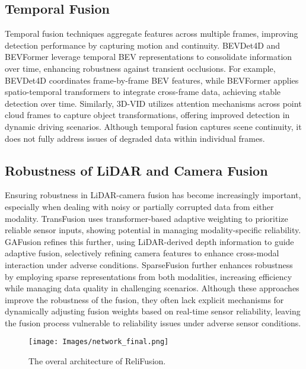 \subsection{Temporal Fusion}
Temporal fusion techniques aggregate features across multiple frames, improving detection performance by capturing motion and continuity. BEVDet4D \cite{huang2022bevdet4d} and BEVFormer \cite{li2022bevformer} leverage temporal BEV representations to consolidate information over time, enhancing robustness against transient occlusions. For example, BEVDet4D coordinates frame-by-frame BEV features, while BEVFormer applies spatio-temporal transformers to integrate cross-frame data, achieving stable detection over time. Similarly, 3D-VID \cite{zhai2022vid} utilizes attention mechanisms across point cloud frames to capture object transformations, offering improved detection in dynamic driving scenarios. Although temporal fusion captures scene continuity, it does not fully address issues of degraded data within individual frames.



\subsection{Robustness of LiDAR and Camera Fusion}
Ensuring robustness in LiDAR-camera fusion has become increasingly important, especially when dealing with noisy or partially corrupted data from either modality. TransFusion \cite{bai2022transfusion} uses transformer-based adaptive weighting to prioritize reliable sensor inputs, showing potential in managing modality-specific reliability. GAFusion \cite{li2024gafusion} refines this further, using LiDAR-derived depth information to guide adaptive fusion, selectively refining camera features to enhance cross-modal interaction under adverse conditions. SparseFusion \cite{xie2023sparsefusion} further enhances robustness by employing sparse representations from both modalities, increasing efficiency while managing data quality in challenging scenarios. Although these approaches improve the robustness of the fusion, they often lack explicit mechanisms for dynamically adjusting fusion weights based on real-time sensor reliability, leaving the fusion process vulnerable to reliability issues under adverse sensor conditions.

\begin{figure*}[tb]
    \centering
  \texttt{[image: Images/network\_final.png]}
  \caption{The overal architecture of ReliFusion.}
  
  \label{fig:Network_Reli}
\end{figure*}


